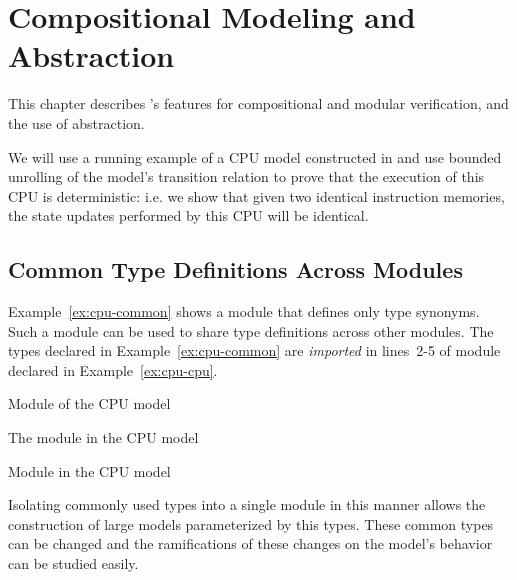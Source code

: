 \chapter{Compositional Modeling and Abstraction}
\label{ch:compositional}

This chapter describes \uclid{}'s features for compositional and modular verification, and the use of abstraction.

We will use a running example of a CPU model constructed in \uclid{} and use bounded unrolling of the model's transition relation to prove that the execution of this CPU is deterministic: i.e. we show that given two identical instruction memories, the state updates performed by this CPU will be identical.

\section{Common Type Definitions Across Modules}

Example~\ref{ex:cpu-common} shows a module that defines only type synonyms. Such a module can be used to share type definitions across other modules. The types declared in Example~\ref{ex:cpu-common} are \emph{imported} in lines~2-5 of module  declared in Example~\ref{ex:cpu-cpu}.

\label{sec:cpu-model}
\begin{uclidlisting}[htbp]
    
    \caption{Module  of the CPU model}
    \label{ex:cpu-common}
\end{uclidlisting}

\begin{uclidlisting}[htbp]
    
    \caption{The  module in the CPU model}
    \label{ex:cpu-cpu}
\end{uclidlisting}


\begin{uclidlisting}[htbp]
    
    \caption{Module  in the CPU model}
    \label{ex:cpu-main}
\end{uclidlisting}


Isolating commonly used types into a single module in this manner allows the construction of large models parameterized by this types. These common types can be changed and the ramifications of these changes on the model's behavior can be studied easily.

